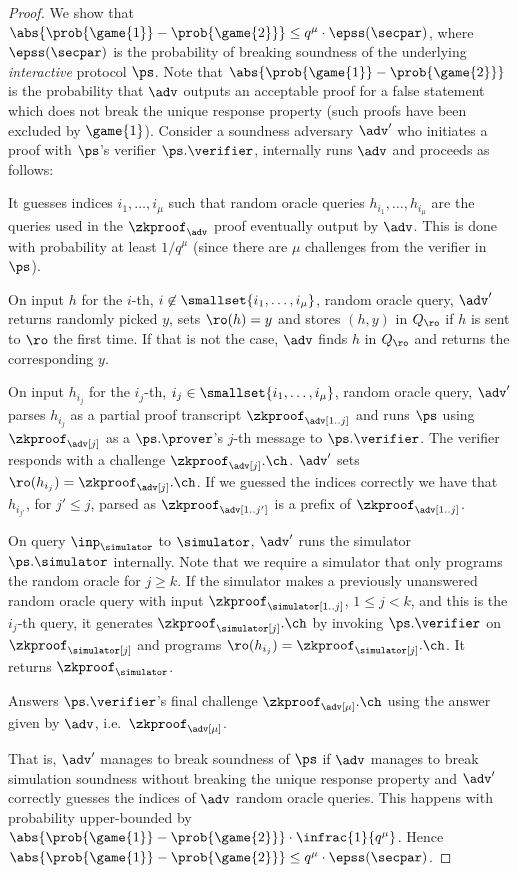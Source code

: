 \begin{proof}
	We show that
	$\abs{\prob{\game{1}} - \prob{\game{2}}} \leq q^{\mu} \cdot \epss(\secpar)$,
	where $\epss(\secpar)$ is the probability of breaking soundness of the underlying
	\emph{interactive} protocol $\ps$. Note that
	$\abs{\prob{\game{1}} - \prob{\game{2}}}$ is the probability that $\adv$
	outputs an acceptable proof for a false statement which does not break the
	unique response property (such proofs have been excluded by
	$\game{1}$). Consider a soundness adversary $\adv'$ who initiates a proof with
	$\ps$'s verifier $\ps.\verifier$, internally runs $\adv$ and proceeds as
	follows:
	\begin{compactitem}
		\item It guesses indices $i_1, \ldots, i_\mu$ such that random oracle queries
		$h_{i_1}, \ldots, h_{i_\mu}$ are the queries used in the $\zkproof_\adv$
		proof eventually output by $\adv$. This is done with probability at least
		$1/q^\mu$ (since there are $\mu$ challenges from the verifier in
		$\ps$).
		\item On input $h$ for the $i$-th,
		$i \not\in \smallset{{i_1}, \ldots, {i_\mu}}$, random oracle query, $\adv'$
		returns randomly picked $y$, sets $\ro(h) = y $ and stores $(h, y)$ in
		$Q_\ro$ if $h$ is sent to $\ro$ the first time. If that is not the case,
		$\adv$ finds $h$ in $Q_\ro$ and returns the corresponding $y$.
		\item On input $h_{i_j}$ for the $i_j$-th,
		$i_j \in \smallset{{i_1}, \ldots, {i_\mu}}$, random oracle query, $\adv'$
		parses $h_{i_j}$ as a partial proof transcript $\zkproof_\adv[1..j]$ and
		runs $\ps$ using $\zkproof_\adv[j]$ as a $\ps.\prover$'s $j$-th message to
		$\ps.\verifier$. The verifier responds with a challenge
		$\zkproof_\adv[j].\ch$. $\adv'$ sets $\ro(h_{i_j}) =
		\zkproof_\adv[j].\ch$. If we guessed the indices correctly we have that
		$h_{i_{j'}}$, for $j' \leq j$, parsed as $\zkproof_\adv[1..j']$ is a prefix
		of $\zkproof_\adv[1..j]$.
		\item On query $\inp_\simulator$ to $\simulator$, $\adv'$ runs the simulator
		$\ps.\simulator$ internally. Note that we require a simulator that only
		programs the random oracle for $j \geq k$.  If the simulator makes a
		previously unanswered random oracle query with input
		$\zkproof_\simulator[1..j]$, $1 \leq j < k$, and this is the $i_j$-th query,
		it generates $\zkproof_\simulator[j].\ch$ by invoking $\ps.\verifier$ on
		$\zkproof_\simulator[j]$ and programs
		$\ro(h_{i_j}) = \zkproof_\simulator[j].\ch$.  It returns
		$\zkproof_\simulator$.
		\item Answers $\ps.\verifier$'s final challenge $\zkproof_\adv[\mu].\ch$ using the
		answer given by $\adv$, i.e.~$\zkproof_\adv[\mu]$.
	\end{compactitem}
	That is, $\adv'$ manages to break soundness of $\ps$ if $\adv$ manages to
	break simulation soundness without breaking the unique response property and
	$\adv'$ correctly guesses the indices of $\adv$ random oracle queries. This
	happens with probability upper-bounded by $\abs{\prob{\game{1}} -
		\prob{\game{2}}} \cdot \infrac{1}{q^{\mu}}$. Hence $\abs{\prob{\game{1}} -
		\prob{\game{2}}} \leq q^{\mu} \cdot \epss(\secpar)$.
	

\end{proof}
